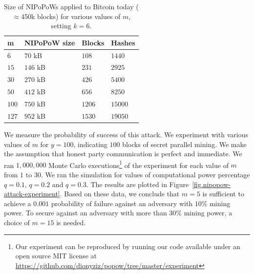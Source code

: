 \begin{table}
  \caption{
    \label{table.size}
    Size of NIPoPoWs applied to Bitcoin today
    ($\approx$450k blocks) for various values of $m$,
    setting $k = 6$.
  }
  \centering
  \begin{tabular}{l|l|l|l}
      {\bf m}  & {\bf NIPoPoW size} & {\bf Blocks} & {\bf
      Hashes}\\
      \hline
      $6$   & $70$  kB & $108$ & $1440$  \\
      $15$  & $146$ kB & $231$ & $2925$  \\
      $30$  & $270$ kB & $426$ & $5400$  \\
      $50$  & $412$ kB & $656$ & $8250$ \\
      $100$ & $750$ kB & $1206$ & $15000$ \\
      $127$ & $952$ kB & $1530$ & $19050$ \\
  \end{tabular}
\end{table}

We measure the probability of success of this attack. We experiment with various
values of $m$ for $y = 100$, indicating $100$ blocks of secret parallel mining.
We make the assumption that honest party communication is perfect and immediate.
We ran $1{,}000{,}000$ Monte Carlo executions\footnote{
Our experiment can be reproduced by running our code available under
an open source MIT license at
\url{https://github.com/dionyziz/popow/tree/master/experiment}}
of the experiment for each value
of $m$ from $1$ to $30$. We ran the simulation for values of computational power
percentage $q = 0.1$, $q = 0.2$ and $q = 0.3$. The results are plotted in
Figure~\ref{fig.nipopow-attack-experiment}.
Based on these data, we conclude that $m = 5$ is sufficient to achieve a $0.001$
probability of failure against an adversary with $10\%$ mining power. To secure
against an adversary with more than $30\%$ mining power, a choice of $m = 15$ is
needed.

